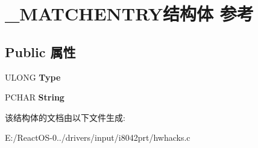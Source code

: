 \hypertarget{struct___m_a_t_c_h_e_n_t_r_y}{}\section{\+\_\+\+M\+A\+T\+C\+H\+E\+N\+T\+R\+Y结构体 参考}
\label{struct___m_a_t_c_h_e_n_t_r_y}
\subsection*{Public 属性}
\begin{DoxyCompactItemize}
\item 
\mbox{\label{struct___m_a_t_c_h_e_n_t_r_y_a6add8fe16a09238f8257e3d627f365e3}} 
U\+L\+O\+NG {\bfseries Type}
\item 
\mbox{\label{struct___m_a_t_c_h_e_n_t_r_y_a6ec58d12138748b0849ef25352c28f60}} 
P\+C\+H\+AR {\bfseries String}
\end{DoxyCompactItemize}


该结构体的文档由以下文件生成\+:\begin{DoxyCompactItemize}
\item 
E\+:/\+React\+O\+S-\/0../drivers/input/i8042prt/hwhacks.\+c\end{DoxyCompactItemize}
